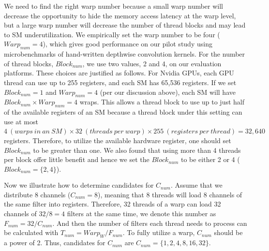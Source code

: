 We need to find the right warp number because a small warp number will decrease the opportunity to hide the memory access latency at the warp level, but a large warp number will decrease the number of thread blocks and may lead to SM underutilization. 
We empirically set the warp number to be four ($Warp_{num}=4$), which gives good performance on our pilot study using microbenchmarks of hand-written depthwise convolution kernels. 
For the number of thread blocks, $Block_{num}$, we use two values, 2 and 4, on our evaluation platforms. 
These choices are justified as follows. For Nvidia GPUs, each GPU thread can use up to 255 registers, and each SM has 65,536 registers. 
If we set $Block_{num}=1$ and $Warp_{num}=4$ (per our discussion above), each SM will have $Block_{num} \times Warp_{num}=4$ wraps. 
This allows a thread block to use up to just half of the available registers of an SM because a thread block under this setting can use at most $4\ (warps\ in\ an\ SM) \times 32\ (threads\ per\ warp) \times 255\ (registers\ per\ thread)=32,640$ registers. 
Therefore, to utilize the available hardware register, one should set $Block_{num}$ to be greater than one. 
We also found that using more than 4 threads per block offer little benefit and hence we set the $Block_{num}$ to be either 2 or 4 ($Block_{num}=\{2,4\}$).


Now we illustrate how to determine candidates for $C_{num}$.
Assume that we distribute 8 channels ($C_{num}=8$), meaning that 8 threads will load 8 channels of the same filter into registers.
Therefore, 32 threads of a warp can load 32 channels of $32/8=4$ filters at the same time, we denote this number as $F_{num}=32/C_{num}$.
And then the number of filters each thread needs to process can be calculated with $T_{num}=Warp_W/F_{num}$.
To fully utilize a warp, $C_{num}$ should be a power of 2.
Thus, candidates for $C_{num}$ are $C_{num}=\{1,2,4,8,16,32\}$.


